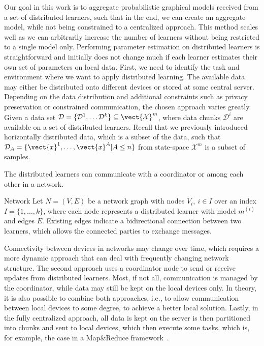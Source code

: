 Our goal in this work is to aggregate probabilistic graphical models received from a set of distributed learners, such that in the end, we can create an aggregate model, while not being constrained to a centralized approach.
This method scales well as we can arbitrarily increase the number of learners without being restricted to a single model only.
Performing parameter estimation on distributed learners is straightforward and initially does not change much if each learner estimates their own set of parameters on local data.
First, we need to identify the task and environment where we want to apply distributed learning.
The available data may either be distributed onto different devices or stored at some central server.
Depending on the data distribution and additional constraints such as privacy preservation or constrained communication, the chosen approach varies greatly.
Given a data set $\mathcal{D} = \{\mathcal{D}^1, \ldots \mathcal{D}^k\} \subseteq \vect{\mathcal{X}}^m$,
where data chunks $\mathcal{D}^i$ are available on a set of distributed learners.
Recall that we previously introduced horizontally distributed data, which is a subset of the data, such that $\mathcal{D}_{A} = \{\vect{x}^1, \ldots, \vect{x}^A \lvert A \leq n\}$ from state-space $\mathcal{X}^m$ is a subset of samples.

The distributed learners can communicate with a coordinator or among each other in a network.

\begin{definition}{Network}
    Let $N = (V, E)$ be a network graph with nodes $V_i, \: i \in I$ over an index $I=\{1,\ldots,k\}$, where each node represents a distributed learner with model $m^{(i)}$ and edges $E$. 
    Existing edges indicate a bidirectional connection between two learners, which allows the connected parties to exchange messages.
\end{definition}

Connectivity between devices in networks may change over time, which requires a more dynamic approach that can deal with frequently changing network structure.
The second approach uses a coordinator node to send or receive updates from distributed learners. 
Most, if not all, communication is managed by the coordinator, while data may still be kept on the local devices only.
In theory, it is also possible to combine both approaches, i.e., to allow communication between local devices to some degree, to achieve a better local solution.
Lastly, in the fully centralized approach, all data is kept on the server is then partitioned into chunks and sent to local devices, which then execute some tasks, which is, for example, the case in a Map\&Reduce framework~\cite{dean2010mapreduce}.

